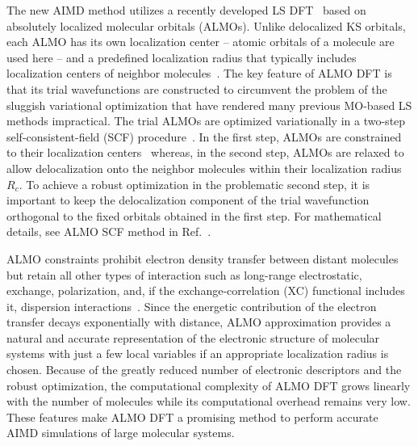 \documentclass[aps,prl,reprint,amsmath,amssymb]{revtex4-1}
\begin{document}
The new AIMD method utilizes a recently developed LS DFT~\cite{a:almo-ls} based on absolutely localized molecular orbitals (\mbox{ALMOs}). 
Unlike delocalized KS orbitals, each \mbox{ALMO} has its own localization center -- atomic orbitals of a molecule are used here -- and a predefined localization radius that typically includes localization centers of neighbor molecules~\cite{a:stoll,a:almo-ls}. 
The key feature of ALMO DFT is that its trial wavefunctions are constructed to circumvent the problem of the sluggish variational optimization that have rendered many previous MO-based LS methods impractical. 
The trial ALMOs are optimized variationally in a two-step self-consistent-field (SCF) procedure~\cite{a:almo-ls}. 
In the first step, ALMOs are constrained to their localization centers~\cite{a:khal} whereas, in the second step, ALMOs are relaxed to allow delocalization onto the neighbor molecules within their localization radius $R_{c}$. 
To achieve a robust optimization in the problematic second step, it is important to keep the delocalization component of the trial wavefunction orthogonal to the fixed orbitals obtained in the first step. 
For mathematical details, see ALMO SCF method in Ref.~.

ALMO constraints prohibit electron density transfer between distant molecules but retain all other types of interaction such as long-range electrostatic, exchange, polarization, and, if the exchange-correlation (XC) functional includes it, dispersion interactions~\cite{a:theeda}. 
Since the energetic contribution of the electron transfer decays exponentially with distance, \mbox{ALMO} approximation provides a natural and accurate representation of the electronic structure of molecular systems with just a few local variables if an appropriate localization radius is chosen. 
Because of the greatly reduced number of electronic descriptors and the robust optimization, the computational complexity of ALMO DFT grows linearly with the number of molecules while its computational overhead remains very low. These features make ALMO DFT a promising method to perform accurate AIMD simulations of large molecular systems.
\end{document}
